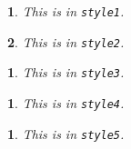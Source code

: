 \documentclass[
]{article}
\author{}
\date{}
\theoremstyle{style1}
\newtheorem{thm1}{}
\theoremstyle{style2}
\newtheorem{thm2}[thm1]{}
\theoremstyle{style3}
\newtheorem*{thm3-unnumbered}{}
\theoremstyle{plain}
\theoremstyle{style4}
\newtheorem{thm4}[theorem]{}
\theoremstyle{style5}
\newtheorem{thm5}[theorem]{}
\begin{document}
\begin{thm1}

This is in \texttt{style1}.

\end{thm1}

\begin{thm2}

This is in \texttt{style2}.

\end{thm2}

\begin{thm3-unnumbered}

This is in \texttt{style3}.

\end{thm3-unnumbered}

\begin{thm4}

This is in \texttt{style4}.

\end{thm4}

\begin{thm5}

This is in \texttt{style5}.

\end{thm5}
\end{document}
